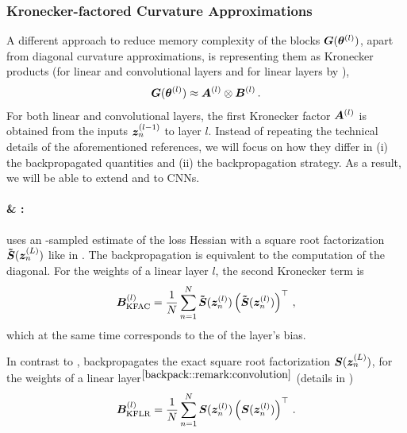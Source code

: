 \subsubsection{Kronecker-factored Curvature Approximations}
A different approach to reduce memory complexity of the \GGN blocks
${\bm{G}}({\bm{\theta}}^{(l)})$, apart from diagonal curvature approximations, is
representing them as Kronecker products (\KFAC for linear
\cite{martens2015optimizing} and convolutional layers \cite{grosse2016kronecker}
\KFLR and \KFRA for linear layers by \cite{botev2017practical}),
\begin{align}
  {\bm{G}}({\bm{\theta}}^{(l)}) \approx {\bm{A}}^{(l)} \otimes {\bm{B}}^{(l)}\,{.}
\end{align}
For both linear and convolutional layers, the first Kronecker factor ${\bm{A}}^{(l)}$
is obtained from the inputs ${\bm{z}}_n^{(l-1)}$ to layer $l$. Instead of repeating
the technical details of the aforementioned references, we will focus on how
they differ in (i) the backpropagated quantities and (ii) the backpropagation
strategy. As a result, we will be able to extend \KFLR and \KFRA to
CNNs.

\paragraph{\KFAC \& \KFLR:}
\KFAC uses an \MC-sampled estimate of the loss Hessian with a square root
factorization $\bm{\tilde{{\bm{S}}}}({\bm{z}}^{(L)}_n)$ like in
. The backpropagation is equivalent to
the computation of the \GGN diagonal. For the weights of a linear
layer $l$, the second Kronecker term is
\begin{align*}
  {\bm{B}}^{(l)}_\text{KFAC}
  =
  \dfrac{1}{N}
  \sum_{n=1}^N
  \bm{\tilde{{\bm{S}}}}({\bm{z}}^{(l)}_n)
  \left(\bm{\tilde{{\bm{S}}}}({\bm{z}}^{(l)}_n)\right)^\top\,{,}
\end{align*}
which at the same time corresponds to the \GGN of the layer's
bias.

In contrast to \KFAC, \KFLR backpropagates the exact square root factorization
${\bm{S}}({\bm{z}}^{(L)}_n)$, \ie for the weights of a linear
layer$^{\ref{backpack::remark:convolution}}$ (details in
\cite{botev2017practical})
\begin{align*}
  {\bm{B}}^{(l)}_\text{KFLR}
  =
  \dfrac{1}{N}
  \sum_{n=1}^N
  {\bm{S}}({\bm{z}}^{(l)}_n)
  \left({\bm{S}}({\bm{z}}^{(l)}_n)\right)^\top\,{.}
\end{align*}

